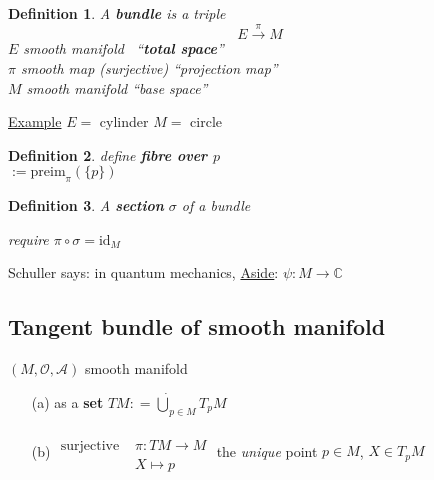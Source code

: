 \documentclass[10pt, twoside]{amsart}
\newtheorem{definition}{Definition}
\begin{document}
\begin{multicols*}{2}
\begin{definition}
  A \textbf{bundle} is a triple 
\[
E \xrightarrow{ \pi } M 
\]
$E$ smooth manifold \quad \, ``\textbf{total space}'' \\
$\pi$ smooth map (surjective)  ``projection map'' \\
$M$ smooth manifold ``base space''

\end{definition}

\underline{Example} $E = $ cylinder
$M = $ circle


\begin{definition}
  define \textbf{fibre over $p$} \\
  \phantom{define} $:= \text{preim}_{\pi}(\lbrace p \rbrace)$
\end{definition}

\begin{definition}
A \textbf{section} $\sigma$ of a bundle






require $\pi \circ \sigma = \text{id}_M$
\end{definition}

Schuller says: in quantum mechanics, 
\underline{Aside}: $\psi : M \to \mathbb{C}$


\subsection{Tangent bundle of smooth manifold}

$(M,\mathcal{O},\mathcal{A})$ smooth manifold

\begin{enumerate}
\item[(a)] as a \textbf{set}
  $TM : = \dot{\bigcup}_{p\in M} T_pM$
\item[(b)] $\begin{aligned} & \quad \\
  \text{surjective } & \pi: TM \to M \\
  & X\mapsto p \end{aligned}$ the \emph{unique} point $p\in M$, $X \in T_pM$  


\end{enumerate}
\end{multicols*}
\end{document}
